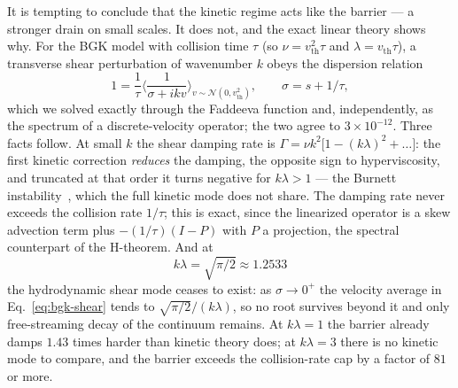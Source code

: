 \documentclass[11pt,a4paper]{article}
\begin{document}
It is tempting to conclude that the kinetic regime acts like the barrier --- a stronger drain on
small scales. It does not, and the exact linear theory shows why. For the BGK model with collision
time $\tau$ (so $\nu=v_{\text{th}}^2\tau$ and $\lambda=v_{\text{th}}\tau$), a transverse shear
perturbation of wavenumber $k$ obeys the dispersion relation
\begin{equation}
  1=\frac1\tau\Big\langle\frac{1}{\sigma+ikv}\Big\rangle_{v\sim\mathcal N(0,v_{\text{th}}^2)},
  \qquad \sigma=s+1/\tau ,
  \label{eq:bgk-shear}
\end{equation}
which we solved exactly through the Faddeeva function and, independently, as the spectrum of a
discrete-velocity operator; the two agree to $3\times10^{-12}$. Three facts follow. At small $k$ the
shear damping rate is $\Gamma=\nu k^2\big[1-(k\lambda)^2+\dots\big]$: the first kinetic correction
\emph{reduces} the damping, the opposite sign to hyperviscosity, and truncated at that order it turns
negative for $k\lambda>1$ --- the Burnett instability~\cite{Bobylev1982}, which the full kinetic mode
does not share. The damping rate never exceeds the collision rate $1/\tau$; this is exact, since the
linearized operator is a skew advection term plus $-(1/\tau)(I-P)$ with $P$ a projection, the
spectral counterpart of the H-theorem. And at
\begin{equation}
  k\lambda=\sqrt{\pi/2}\approx1.2533
  \label{eq:bgk-termination}
\end{equation}
the hydrodynamic shear mode ceases to exist: as $\sigma\to0^+$ the velocity average in
Eq.~\eqref{eq:bgk-shear} tends to $\sqrt{\pi/2}/(k\lambda)$, so no root survives beyond it and only
free-streaming decay of the continuum remains. At $k\lambda=1$ the barrier already damps $1.43$
times harder than kinetic theory does; at $k\lambda=3$ there is no kinetic mode to compare, and the
barrier exceeds the collision-rate cap by a factor of $81$ or more.
\end{document}
